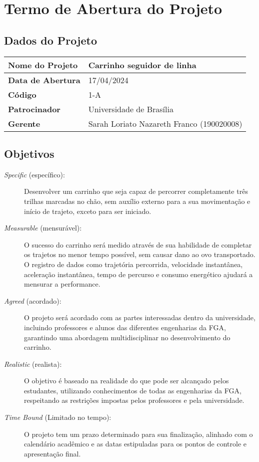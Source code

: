 \chapter{Termo de Abertura do Projeto}

\section{Dados do Projeto}

\begin{center}
  \begin{tabular}{|l|l|}
    \hline
    \textbf{Nome do Projeto} & Carrinho seguidor de linha \\
    \hline
    \textbf{Data de Abertura} & 17/04/2024 \\
    \hline
    \textbf{Código} & 1-A \\
    \hline
    \textbf{Patrocinador} & Universidade de Brasília \\
    \hline
    \textbf{Gerente} & Sarah Loriato Nazareth Franco (190020008) \\
    \hline
  \end{tabular}
\end{center}

\section{Objetivos}

\begin{description}
  \item [\textit{Specific} (específico):]
    Desenvolver um carrinho que seja capaz de percorrer completamente três
    trilhas marcadas no chão, sem auxílio externo para a sua movimentação e
    início de trajeto, exceto para ser iniciado.
  \item [\textit{Measurable} (mensurável):]
    O sucesso do carrinho será medido através de sua habilidade de completar os
    trajetos no menor tempo possível, sem causar dano ao ovo transportado. O
    registro de dados como trajetória percorrida, velocidade instantânea,
    aceleração instantânea, tempo de percurso e consumo energético ajudará a
    mensurar a performance.
  \item [\textit{Agreed} (acordado):]
    O projeto será acordado com as partes interessadas dentro da universidade,
    incluindo professores e alunos das diferentes engenharias da FGA, garantindo
    uma abordagem multidisciplinar no desenvolvimento do carrinho.
  \item [\textit{Realistic} (realista):]
    O objetivo é baseado na realidade do que pode ser alcançado pelos
    estudantes, utilizando conhecimentos de todas as engenharias da FGA,
    respeitando as restrições impostas pelos professores e pela universidade.
  \item [\textit{Time Bound} (Limitado no tempo):]
    O projeto tem um prazo determinado para sua finalização, alinhado com o
    calendário acadêmico e as datas estipuladas para os pontos de controle e
    apresentação final.
\end{description}

